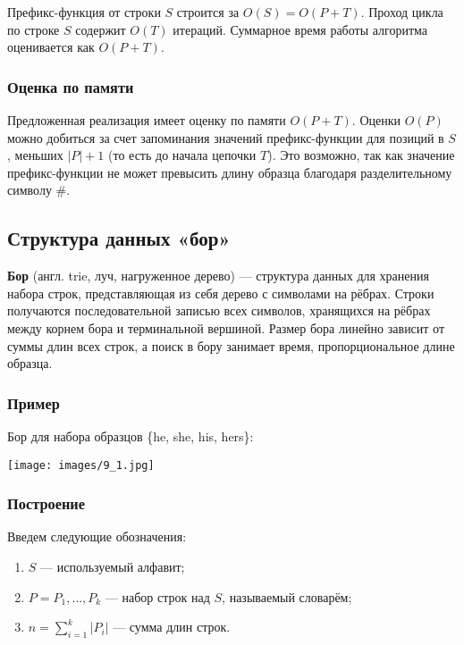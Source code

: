 Префикс-функция от строки $S$ строится за $O(S)=O(P+T)$.
Проход цикла по строке $S$ содержит $O(T)$ итераций.
Суммарное время работы алгоритма оценивается как $O(P+T)$. 

\subsubsection{Оценка по памяти}

Предложенная реализация имеет оценку по памяти $O(P+T)$.
Оценки $O(P)$ можно добиться за счет запоминания значений префикс-функции для позиций в $S$, меньших $|P|+1$ (то есть до начала цепочки $T$).
Это возможно, так как значение префикс-функции не может превысить длину образца благодаря разделительному символу $\#$. 

\subsection{Структура данных «бор»}

\begin{definition}
    \textbf{Бор} (англ. trie, луч, нагруженное дерево) --- структура данных для хранения набора строк, представляющая из себя дерево с символами на рёбрах.
    Строки получаются последовательной записью всех символов, хранящихся на рёбрах между корнем бора и терминальной вершиной.
    Размер бора линейно зависит от суммы длин всех строк, а поиск в бору занимает время, пропорциональное длине образца. 
\end{definition}

\subsubsection{Пример}

Бор для набора образцов \{he, she, his, hers\}:

\texttt{[image: images/9\_1.jpg]}

\subsubsection{Построение}

Введем следующие обозначения:

\begin{enumerate}
    \item $S$ --- используемый алфавит;
    \item $P={P_1,…,P_k}$ --- набор строк над $S$, называемый словарём;
    \item $n = \sum_{i = 1}^k |P_i|$ --- сумма длин строк.
\end{enumerate}

